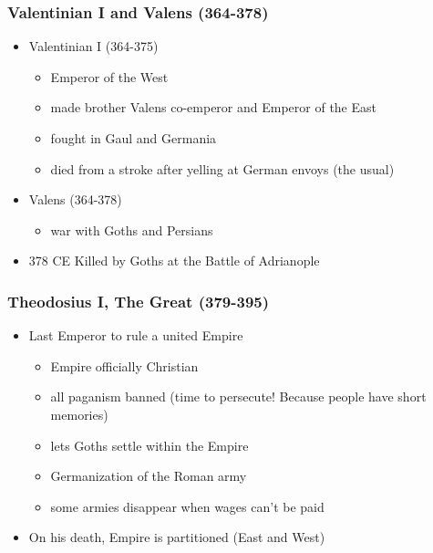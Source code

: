 \documentclass[12pt, twoside]{article}
\begin{document}
\subsubsection{Valentinian I and Valens (364-378)}
\begin{itemize}
\item Valentinian I (364-375)
	\begin{itemize}
	\item Emperor of the West
	\item made brother Valens co-emperor and Emperor of the East
	\item fought in Gaul and Germania
	\item died from a stroke after yelling at German envoys (the usual)
	\end{itemize}
\item Valens (364-378)
	\begin{itemize}
	\item war with Goths and Persians
	\end{itemize}
\item 378 CE Killed by Goths at the Battle of Adrianople
\end{itemize}

\subsubsection{Theodosius I, The Great (379-395)}
\begin{itemize}
\item Last Emperor to rule a united Empire
	\begin{itemize}
	\item Empire officially Christian
	\item all paganism banned (time to persecute! Because people have short memories)
	\item lets Goths settle within the Empire
	\item Germanization of the Roman army
	\item some armies disappear when wages can’t be paid
	\end{itemize}
\item On his death, Empire is partitioned (East and West)
\end{itemize}
\end{document}
